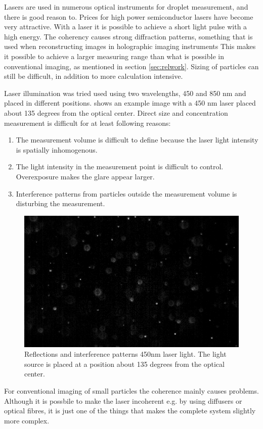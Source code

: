 Lasers are used in numerous optical instruments for droplet measurement, and there is good reason to. Prices for high power semiconductor lasers have become very attractive. With a laser it is possible to achieve a short light pulse with a high energy. The coherency causes strong diffraction patterns, something that is used when reconstructing images in holographic imaging instruments This makes it possible to achieve a larger measuring range than what is possible in conventional imaging, as mentioned in section \ref{sec:relwork}. Sizing of particles can still be difficult, in addition to more calculation intensive. 
 
Laser illumination was tried used using two wavelengths, 450 and 850 nm and placed in different positions.  shows an example image with a 450 nm laser placed about 135 degrees from the optical center. Direct size and concentration measurement is difficult for at least following reasons: 
\begin{enumerate}
\item The measurement volume is difficult to define because the laser light intensity is spatially inhomogenous.
\item The light intensity in the measurement point is difficult to control. Overexposure makes the glare appear larger.
\item Interference patterns from particles outside the measurement volume is disturbing the measurement.
\end{enumerate}

\begin{figure}%
\centering\includegraphics[width=0.6\linewidth]{figures/450nm45deg}
\caption{Reflections and interference patterns 450nm laser light. The light source is placed at a position about 135 degrees from the optical center.}
\label{fig:laser}
\end{figure}

For conventional imaging of small particles the coherence mainly causes problems. Although it is possbile to make the laser incoherent e.g. by using diffusers or optical fibres, it is just one of the things that makes the complete system slightly more complex.


